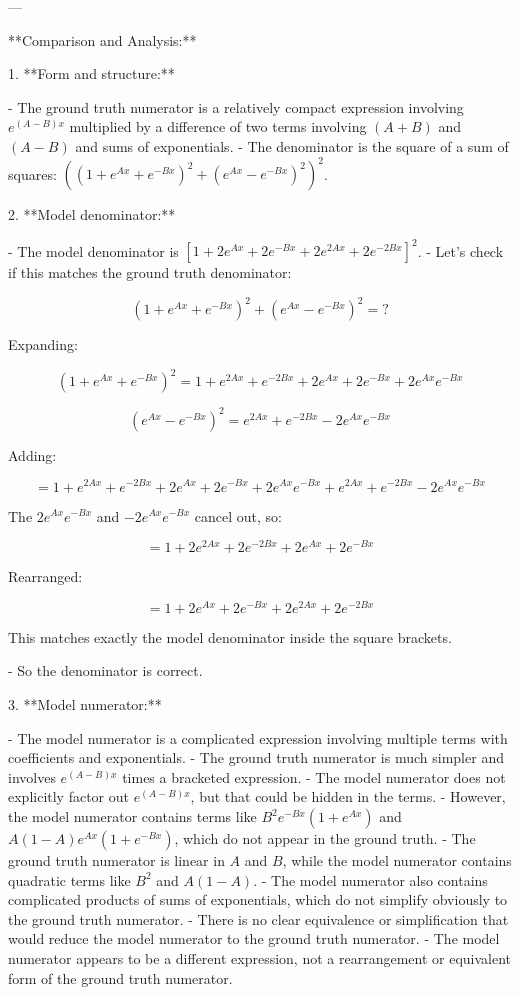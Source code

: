 \documentclass[10pt]{article}
\begin{document}
---

**Comparison and Analysis:**

1. **Form and structure:**

   - The ground truth numerator is a relatively compact expression involving \( e^{(A-B)x} \) multiplied by a difference of two terms involving \((A+B)\) and \((A-B)\) and sums of exponentials.
   - The denominator is the square of a sum of squares: \(\left( (1+e^{Ax}+e^{-Bx})^2 + (e^{Ax}-e^{-Bx})^2 \right)^2\).

2. **Model denominator:**

   - The model denominator is \(\left[1 + 2e^{Ax} + 2e^{-Bx} + 2e^{2Ax} + 2e^{-2Bx}\right]^2\).
   - Let's check if this matches the ground truth denominator:

     \[
     (1 + e^{Ax} + e^{-Bx})^2 + (e^{Ax} - e^{-Bx})^2 = ?
     \]

     Expanding:

     \[
     (1 + e^{Ax} + e^{-Bx})^2 = 1 + e^{2Ax} + e^{-2Bx} + 2e^{Ax} + 2e^{-Bx} + 2e^{Ax} e^{-Bx}
     \]

     \[
     (e^{Ax} - e^{-Bx})^2 = e^{2Ax} + e^{-2Bx} - 2 e^{Ax} e^{-Bx}
     \]

     Adding:

     \[
     = 1 + e^{2Ax} + e^{-2Bx} + 2e^{Ax} + 2e^{-Bx} + 2e^{Ax} e^{-Bx} + e^{2Ax} + e^{-2Bx} - 2 e^{Ax} e^{-Bx}
     \]

     The \(2 e^{Ax} e^{-Bx}\) and \(-2 e^{Ax} e^{-Bx}\) cancel out, so:

     \[
     = 1 + 2 e^{2Ax} + 2 e^{-2Bx} + 2 e^{Ax} + 2 e^{-Bx}
     \]

     Rearranged:

     \[
     = 1 + 2 e^{Ax} + 2 e^{-Bx} + 2 e^{2Ax} + 2 e^{-2Bx}
     \]

     This matches exactly the model denominator inside the square brackets.

   - So the denominator is correct.

3. **Model numerator:**

   - The model numerator is a complicated expression involving multiple terms with coefficients and exponentials.
   - The ground truth numerator is much simpler and involves \( e^{(A-B)x} \) times a bracketed expression.
   - The model numerator does not explicitly factor out \( e^{(A-B)x} \), but that could be hidden in the terms.
   - However, the model numerator contains terms like \( B^2 e^{-Bx} (1 + e^{Ax}) \) and \( A(1 - A) e^{Ax} (1 + e^{-Bx}) \), which do not appear in the ground truth.
   - The ground truth numerator is linear in \( A \) and \( B \), while the model numerator contains quadratic terms like \( B^2 \) and \( A(1 - A) \).
   - The model numerator also contains complicated products of sums of exponentials, which do not simplify obviously to the ground truth numerator.
   - There is no clear equivalence or simplification that would reduce the model numerator to the ground truth numerator.
   - The model numerator appears to be a different expression, not a rearrangement or equivalent form of the ground truth numerator.
\end{document}
